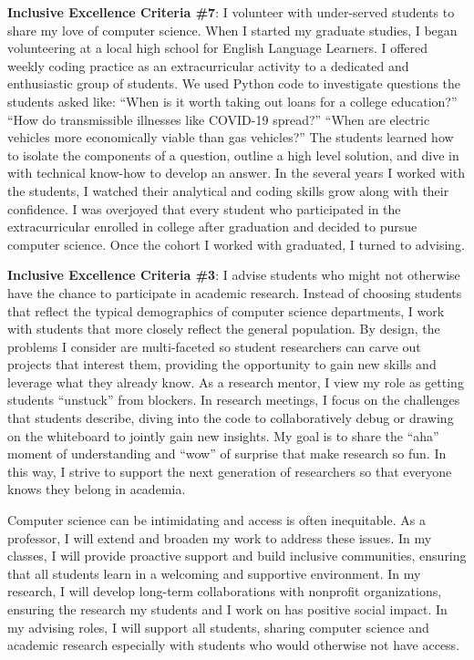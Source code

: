 \documentclass[11pt]{article}
\begin{document}
{\textbf{Inclusive Excellence Criteria \#7}:
I volunteer with under-served students to share my love of computer science. When I started my graduate studies, I began volunteering at a local high school for English Language Learners. I offered weekly coding practice as an extracurricular activity to a dedicated and enthusiastic group of students. We used Python code to investigate questions the students asked like: ``When is it worth taking out loans for a college education?'' ``How do transmissible illnesses like COVID-19 spread?'' ``When are electric vehicles more economically viable than gas vehicles?'' The students learned how to isolate the components of a question, outline a high level solution, and dive in with technical know-how to develop an answer. In the several years I worked with the students, I watched their analytical and coding skills grow along with their confidence. I was overjoyed that every student who participated in the extracurricular enrolled in college after graduation and decided to pursue computer science. Once the cohort I worked with graduated, I turned to advising.

\textbf{Inclusive Excellence Criteria \#3}:
I advise students who might not otherwise have the chance to participate in academic research. Instead of choosing students that reflect the typical demographics of computer science departments, I work with students that more closely reflect the general population. By design, the problems I consider are multi-faceted so student researchers can carve out projects that interest them, providing the opportunity to gain new skills and leverage what they already know. As a research mentor, I view my role as getting students “unstuck” from blockers. In research meetings, I focus on the challenges that students describe, diving into the code to collaboratively debug or drawing on the whiteboard to jointly gain new insights. My goal is to share the “aha” moment of understanding and “wow” of surprise that make research so fun. In this way, I strive to support the next generation of researchers so that everyone knows they belong in academia.

Computer science can be intimidating and access is often inequitable. As a professor, I will extend and broaden my work to address these issues. In my classes, I will provide proactive support and build inclusive communities, ensuring that all students learn in a welcoming and supportive environment. In my research, I will develop long-term collaborations with nonprofit organizations, ensuring the research my students and I work on has positive social impact. In my advising roles, I will support all students, sharing computer science and academic research especially with students who would otherwise not have access.
}



\end{document}
